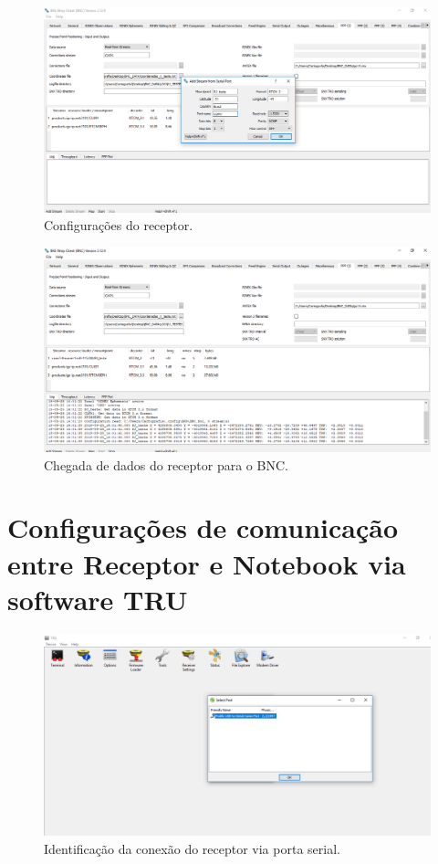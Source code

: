 \begin{figure}[H]
\centering
\includegraphics[scale=0.4]{img/19bnc.png} %
\caption{Configurações do receptor.}
\label{Rotulo}
\end{figure}


\begin{figure}[H]
\centering
\includegraphics[scale=0.4]{img/21bnc.png} %
\caption{Chegada de dados do receptor para o BNC.}
\label{Rotulo}
\end{figure}






\section{Configurações de comunicação entre Receptor e Notebook via software TRU}

\begin{figure}[H]
\centering
\includegraphics[scale=0.4]{img/2.png} %
\caption{Identificação da conexão do receptor via porta serial.}
\label{Rotulo}
\end{figure}


